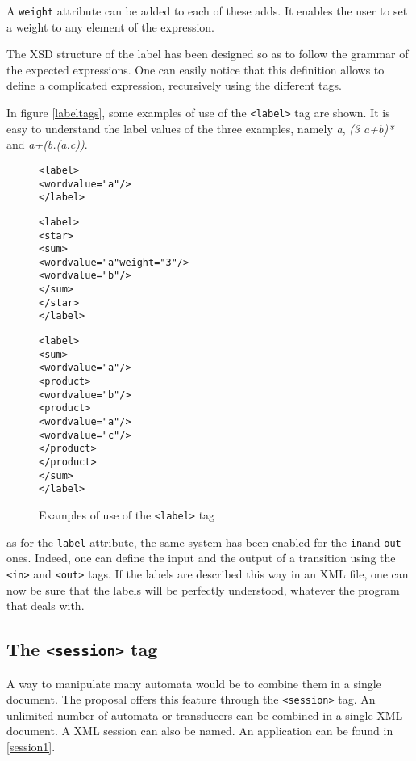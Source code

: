 \documentclass[a4paper]{article}
\newcommand{\xtag}[1]{\texttt{<#1>}}
\newcommand{\xattr}[1]{\texttt{#1}}
\begin{document}
A \xattr{weight} attribute can be added to each of these adds. It enables the
user to set a weight to any element of the expression.

The XSD structure of the label has been designed so as to follow the grammar of
the expected expressions. One can easily notice that this definition allows to
define a complicated expression, recursively using the different tags.

In figure \autoref{labeltags}, some examples of use of the \xtag{label} tag are
shown. It is easy to understand the label values of the three examples, namely
\textit{a}, \textit{(3 a+b)*} and \textit{a+(b.(a.c))}.

\begin{figure}[htp]
  \begin{center}
\begin{alltt}
<label>
  <word value="a"/>
</label>

<label>
  <star>
    <sum>
      <word value="a" weight="3"/>
      <word value="b"/>
    </sum>
  </star>
</label>

<label>
  <sum>
    <word value="a"/>
    <product>
      <word value="b"/>
      <product>
        <word value="a"/>
        <word value="c"/>
      </product>
    </product>
  </sum>
</label>
\end{alltt}

\caption{Examples of use of the \xtag{label} tag}
\label{labeltags}
  \end{center}
\end{figure}

as for the \xattr{label} attribute, the same system has been enabled for the
\xattr{in}and \xattr{out} ones. Indeed, one can define the input and the output
of a transition using the \xtag{in} and \xtag{out} tags.
If the labels are described this way in an XML file, one can now be sure that
the labels will be perfectly understood, whatever the program that deals with.



\subsection{The \xtag{session} tag}

A way to manipulate many automata would be to combine them in a single
document. The proposal offers this feature through the \xtag{session}
tag. An unlimited number of automata or transducers can be combined in
a single XML document. A XML session can also be named.  An
application can be found in \autoref{session1}.
\end{document}
